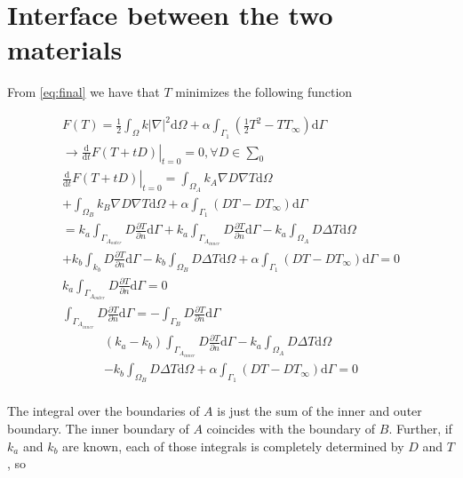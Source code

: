 \section{Interface between the two materials} 

From \ref{eq:final} we have that $T$ minimizes the following function

\begin{gather*}
F(T) = \frac{1}{2}\int_{\Omega}k\left|\nabla\right|^2\mathrm{d}\Omega + \alpha \int_{\Gamma_1}\left(\frac{1}{2}T^2-TT_{\infty}\right)\mathrm{d}\Gamma\\
\rightarrow \left.\frac{\mathrm{d}}{\mathrm{d}t}F(T+tD)\right|_{t=0} = 0, \forall D \in \sum_0\\
\left.\frac{\mathrm{d}}{\mathrm{d}t}F(T+tD)\right|_{t=0} =  \int_{\Omega_A}k_A\nabla D \nabla T \mathrm{d}\Omega\\ + \int_{\Omega_B}k_B\nabla D \nabla T \mathrm{d}\Omega + \alpha \int_{\Gamma_1}\left(DT-DT_{\infty}\right)\mathrm{d}\Gamma\\
= k_a\int_{\Gamma_{A_{outer}}}D\frac{\partial T}{\partial n}\mathrm{d}\Gamma + k_a\int_{\Gamma_{A_{inner}}}D\frac{\partial T}{\partial n}\mathrm{d}\Gamma - k_a\int_{\Omega_A}D\Delta T \mathrm{d}\Omega \\
+ k_b \int_{k_b}D\frac{\partial T}{\partial n}\mathrm{d}\Gamma - k_b\int_{\Omega_B}D\Delta T \mathrm{d}\Omega + \alpha \int_{\Gamma_1}\left(DT-DT_{\infty}\right)\mathrm{d}\Gamma = 0\\
k_a\int_{\Gamma_{A_{outer}}}D\frac{\partial T}{\partial n}\mathrm{d}\Gamma = 0\\
\int_{\Gamma_{A_{inner}}}D\frac{\partial T}{\partial n}\mathrm{d}\Gamma = -\int_{\Gamma_{B}}D\frac{\partial T}{\partial n}\mathrm{d}\Gamma
\end{gather*}
\begin{gather*}
\left(k_a-k_b\right)\int_{\Gamma_{A_{inner}}}D\frac{\partial T}{\partial n}\mathrm{d}\Gamma - k_a\int_{\Omega_A}D\Delta T \mathrm{d}\Omega\\ - k_b\int_{\Omega_B}D\Delta T \mathrm{d}\Omega + \alpha \int_{\Gamma_1}\left(DT-DT_{\infty}\right)\mathrm{d}\Gamma = 0\\
\end{gather*}


The integral over the boundaries of $A$ is just the sum of the inner and outer boundary. The inner boundary of $A$ coincides with the boundary of $B$. Further, if $k_a$ and $k_b$ are known, each of those integrals is completely determined by $D$ and $T$, so 

